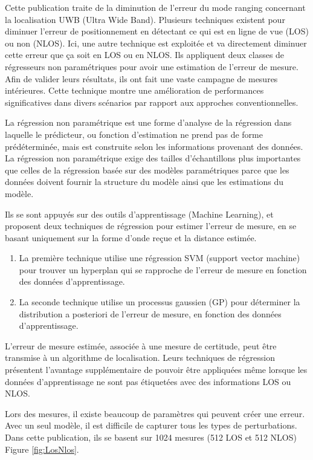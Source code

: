 Cette publication traite de la diminution de l'erreur du mode ranging concernant la localisation UWB (Ultra Wide Band). Plusieurs techniques existent pour diminuer l'erreur de positionnement en détectant ce qui est en ligne de vue (LOS) ou non (NLOS). Ici, une autre technique est exploitée et va directement diminuer cette erreur que ça soit en LOS ou en NLOS. Ils appliquent deux classes de régresseurs non paramétriques pour avoir une estimation de l'erreur de mesure. Afin de valider leurs résultats, ils ont fait une vaste campagne de mesures intérieures. Cette technique montre une amélioration de performances significatives dans divers scénarios par rapport aux approches conventionnelles. 

La régression non paramétrique est une forme d'analyse de la régression dans laquelle le prédicteur, ou fonction d'estimation ne prend pas de forme prédéterminée, mais est construite selon les informations provenant des données. La régression non paramétrique exige des tailles d'échantillons plus importantes que celles de la régression basée sur des modèles paramétriques parce que les données doivent fournir la structure du modèle ainsi que les estimations du modèle. \cite{WIKI1}

Ils se sont appuyés sur des outils d'apprentissage (Machine Learning), et proposent deux techniques de régression pour estimer l’erreur de mesure, en se basant uniquement sur la forme d’onde reçue et la distance estimée.

\begin{enumerate}
 \item La première technique utilise une régression SVM (support vector machine) pour trouver un hyperplan qui se rapproche de l'erreur de mesure en fonction des données d'apprentissage. 
 \item La seconde technique utilise un processus gaussien (GP) pour déterminer la distribution a posteriori de l'erreur de mesure, en fonction des données d'apprentissage. 
\end{enumerate}

L'erreur de mesure estimée, associée à une mesure de certitude, peut être transmise à un algorithme de localisation. Leurs techniques de régression présentent l'avantage supplémentaire de pouvoir être appliquées même lorsque les données d'apprentissage ne sont pas étiquetées avec des informations LOS ou NLOS.

Lors des mesures, il existe beaucoup de paramètres qui peuvent créer une erreur. Avec un seul modèle, il est difficile de capturer tous les types de perturbations. Dans cette publication, ils se basent sur 1024 mesures (512 LOS et 512 NLOS) Figure \ref{fig:LosNlos}.

